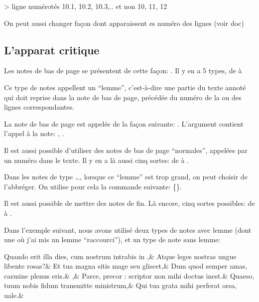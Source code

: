   > ligne numérotés 10.1, 10.2, 10.3,.. et non 10, 11, 12 

On peut aussi changer façon dont apparaissent es numéro des lignes (voir doc)



\subsection{L'apparat critique}

Les notes de bas de page se présentent de cette façon:  . Il y en a 5 types, de  à 


Ce type de notes appellent un \enquote{lemme}, c'est-à-dire une partie du texte annoté qui doit reprise dans la note de bas de page, précédée du numéro de la ou des lignes correspondantes. 

La note de bas de page est appelée de la façon suivante:  . L'argument  contient l'appel à la note: , .

Il est aussi possible d'utiliser  des  notes de bas de page \enquote{normales}, appelées par un numéro dans le texte. Il y en a là aussi cinq sortes: de  à .

Dans les notes de type \dots, lorsque ce \enquote{lemme} est trop grand, on peut choisir de l'abbréger. On utilise pour cela la commande suivante: 
\{\}. 

\begin{plusloins}
Il est aussi possible de mettre des notes de fin. Là encore, cinq sortes possibles:  de  à .
\end{plusloins}

Dans l'exemple suivant, nous avons utilisé deux types de notes avec lemme (dont une où j'ai mis un lemme \enquote{raccourci}), et  un type de note sans lemme:


\begin{latexcode}
\stanza
Quando erit illa dies, cum nostrum intrabis in 
{},&
 Atque leges nostras ungue libente rosas?&
Et tua magna sitis mage seu 
{} gliscet,&
 Dum quod semper amas, carmine plenus eris.&
{},&
 Parce, precor : scriptor non mihi doctus inest.&
Quaeso, tuum nobis fidum transmitte ministrum,&
 Qui tua grata mihi perferat orsa, uale.\&
\end{latexcode}

